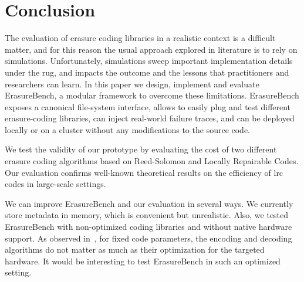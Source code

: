 \section{Conclusion}
\label{sec:conclusion}
The evaluation of erasure coding libraries in a realistic context is a difficult matter, and for this reason the usual approach explored in literature is to rely on simulations.
Unfortunately, simulations sweep important implementation details under the rug, and impacts the outcome and the lessons that practitioners and researchers can learn. In this paper we design, implement and evaluate ErasureBench, a modular framework to overcome these limitations.
ErasureBench exposes a canonical file-system interface, allows to easily plug and test different erasure-coding libraries, can inject real-world failure traces, and can be deployed locally or on a cluster without any modifications to the source code.

We test the validity of our prototype by evaluating the cost of two different erasure coding algorithms based on Reed-Solomon and Locally Repairable Codes. Our evaluation confirms well-known theoretical results on the efficiency of \ac{lrc} codes in large-scale settings.  

We can improve ErasureBench and our evaluation in several ways. We currently store metadata in memory, which is convenient but unrealistic. Also, we tested ErasureBench with non-optimized coding libraries and without native hardware support. As observed in~\cite{Burihabwa2016}, for fixed code parameters, the encoding and decoding algorithms do not matter as much as their optimization for the targeted hardware. It would be interesting to test ErasureBench in such an optimized setting.
